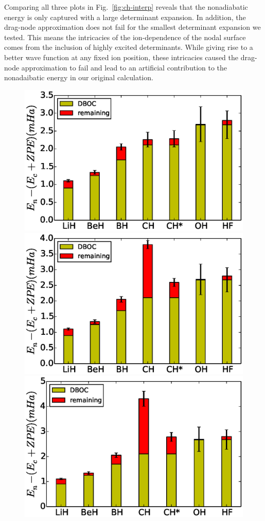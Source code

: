 \documentclass[aip,jcp,numerical,reprint]{revtex4-1}
\begin{document}
Comparing all three plots in Fig.~\ref{fig:ch-interp} reveals that the nonadiabatic energy is only captured with a large determinant expansion. In addition, the drag-node approximation does not fail for the smallest determinant expansion we tested. This means the intricacies of the ion-dependence of the nodal surface comes from the inclusion of highly excited determinants. While giving rise to a better wave function at any fixed ion position, these intricacies caused the drag-node approximation to fail and lead to an artificial contribution to the nonadaibatic energy in our original calculation.

\begin{figure}[h]
\includegraphics[scale=0.5]{35}
\includegraphics[scale=0.5]{723}
\includegraphics[scale=0.5]{4738}

\end{figure}
\end{document}
